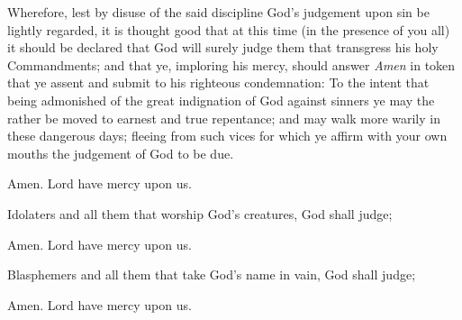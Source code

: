 









Wherefore, lest by disuse of the said discipline God’s judgement upon sin be lightly regarded, it is thought good that at this time (in the presence of you all) it should be declared that God will surely judge them that transgress his holy Commandments; and that ye, imploring his mercy, should answer \emph{Amen} in token that ye assent and submit to his righteous condemnation: To the intent that being admonished of the great indignation of God against sinners ye may the rather be moved to earnest and true repentance; and may walk more warily in these dangerous days; fleeing from such vices for which ye affirm with your own mouths the judgement of God to be due.


\centerline{}

\R Amen.  Lord have mercy upon us.

Idolaters and all them that worship God’s creatures, God shall judge;

\R Amen.  Lord have mercy upon us.

Blasphemers and all them that take God’s name in vain, God shall judge; 

\R Amen.  Lord have mercy upon us.

